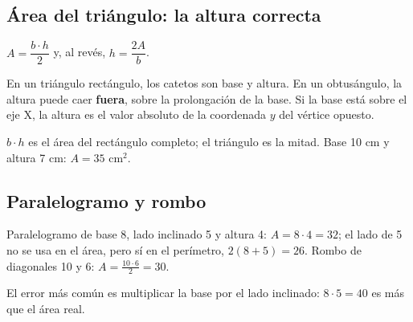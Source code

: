 \subsection{Área del triángulo: la altura correcta}
\begin{clave}[Triángulo] $A = \dfrac{b \cdot h}{2}$ \qquad y, al revés, \qquad $h = \dfrac{2A}{b}$.\end{clave}
En un triángulo rectángulo, los catetos son base y altura. En un obtusángulo, la altura puede caer \textbf{fuera}, sobre la prolongación de la base. Si la base está sobre el eje X, la altura es el valor absoluto de la coordenada $y$ del vértice opuesto.
\begin{ojo} $b \cdot h$ es el área del rectángulo completo; el triángulo es la mitad. Base 10 cm y altura 7 cm: $A = 35$ cm$^2$.\end{ojo}

\subsection{Paralelogramo y rombo}
\begin{ejemplo} Paralelogramo de base 8, lado inclinado 5 y altura 4: $A = 8 \cdot 4 = 32$; el lado de 5 no se usa en el área, pero sí en el perímetro, $2(8 + 5) = 26$. Rombo de diagonales 10 y 6: $A = \frac{10 \cdot 6}{2} = 30$.\end{ejemplo}
\begin{ojo} El error más común es multiplicar la base por el lado inclinado: $8 \cdot 5 = 40$ es más que el área real.\end{ojo}

